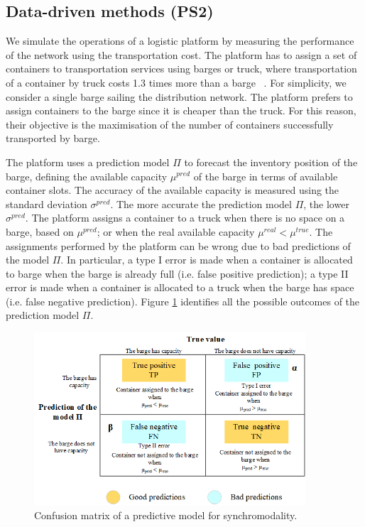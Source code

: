 \subsection{Data-driven methods (PS2)}
We simulate the operations of a logistic platform by measuring the performance of the network using the transportation cost. The platform has to assign a set of containers to transportation services using barges or truck, where transportation of a container by truck costs 1.3 times more than a barge ~\cite{Fu2010,Konings2003}. For simplicity, we consider a single barge sailing the distribution network. The platform prefers to assign containers to the barge since it is cheaper than the truck. For this reason, their objective is the maximisation of the number of containers successfully transported by barge.

The platform uses a prediction model $\Pi$ to forecast the inventory position of the barge, defining the available capacity $\mu^{pred}$ of the barge in terms of available container slots. The accuracy of the available capacity is measured using the standard deviation $\sigma^{pred}$. The more accurate the prediction model $\Pi$, the lower $\sigma^{pred}$. The platform assigns a container to a truck when there is no space on a barge, based on $\mu^{pred}$; or when the real available capacity $\mu^{real}<\mu^{true}$. The assignments performed by the platform can be wrong due to bad predictions of the model $\Pi$. In particular, a type I error is made when a container is allocated to barge when the barge is already full (i.e. false positive prediction); a type II error is made when a container is allocated to a truck when the barge has space (i.e. false negative prediction). Figure \ref{fig_confusionMatrixPlatform} identifies all the possible outcomes of the prediction model $\Pi$. 


\begin{figure}[hbt!]
\centering
\includegraphics[width=0.9\textwidth]{SectionDistribution/control_figures/fig_confusionMatrixPlatform.png}
\captionsetup{type=figure}
\caption{Confusion matrix of a predictive model for synchromodality.}
\label{fig_confusionMatrixPlatform}
\end{figure}


